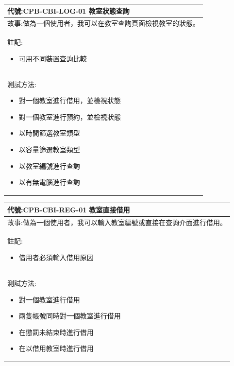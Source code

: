 \documentclass{article}
\begin{document}
\begin{table}[H]
	\begin{tabular}{| m{13cm} |}
		\hline
		代號:CPB-CBI-LOG-01	教室狀態查詢      \\ \hline
		故事:做為一個使用者，我可以在教室查詢頁面檢視教室的狀態。 \\	\hline
		註記:
		\begin{itemize}
			\item 可用不同裝置查詢比較
		\end{itemize}               \\ \hline
		測試方法:
		\begin{itemize}
			\item 對一個教室進行借用，並檢視狀態
			\item 對一個教室進行預約，並檢視狀態
			\item 以時間篩選教室類型
			\item 以容量篩選教室類型
			\item 以教室編號進行查詢
			\item 以有無電腦進行查詢
		\end{itemize}
		\\	\hline
	\end{tabular}
\end{table}

\begin{table}[H]
	\begin{tabular}{| m{13cm} |}
		\hline
		代號:CPB-CBI-REG-01	教室直接借用          \\ \hline
		故事:做為一個使用者，我可以輸入教室編號或直接在查詢介面進行借用。 \\	\hline
		註記:
		\begin{itemize}
			\item 借用者必須輸入借用原因
		\end{itemize}                  \\ \hline
		測試方法:
		\begin{itemize}
			\item 對一個教室進行借用
			\item 兩隻帳號同時對一個教室進行借用
			\item 在懲罰未結束時進行借用
			\item 在以借用教室時進行借用
		\end{itemize}
		\\	\hline
	\end{tabular}
\end{table}
\end{document}
